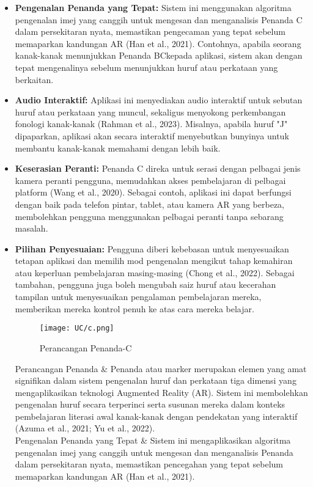 \begin{itemize}
\item \textbf{Pengenalan Penanda yang Tepat:} Sistem ini menggunakan algoritma pengenalan imej yang canggih untuk mengesan dan menganalisis Penanda C dalam persekitaran nyata, memastikan pengecaman yang tepat sebelum memaparkan kandungan AR (Han et al., 2021). Contohnya, apabila seorang kanak-kanak menunjukkan Penanda BCkepada aplikasi, sistem akan dengan tepat mengenalinya sebelum menunjukkan huruf atau perkataan yang berkaitan.  \\
\item \textbf{Audio Interaktif:} Aplikasi ini menyediakan audio interaktif untuk sebutan huruf atau perkataan yang muncul, sekaligus menyokong perkembangan fonologi kanak-kanak (Rahman et al., 2023). Misalnya, apabila huruf "J" dipaparkan, aplikasi akan secara interaktif menyebutkan bunyinya untuk membantu kanak-kanak memahami dengan lebih baik. \\ 
\item \textbf{Keserasian Peranti:} Penanda C direka untuk serasi dengan pelbagai jenis kamera peranti pengguna, memudahkan akses pembelajaran di pelbagai platform (Wang et al., 2020). Sebagai contoh, aplikasi ini dapat berfungsi dengan baik pada telefon pintar, tablet, atau kamera AR yang berbeza, membolehkan pengguna menggunakan pelbagai peranti tanpa sebarang masalah.  \\
\item \textbf{Pilihan Penyesuaian:} Pengguna diberi kebebasan untuk menyesuaikan tetapan aplikasi dan memilih mod pengenalan mengikut tahap kemahiran atau keperluan pembelajaran masing-masing (Chong et al., 2022). Sebagai tambahan, pengguna juga boleh mengubah saiz huruf atau kecerahan tampilan untuk menyesuaikan pengalaman pembelajaran mereka, memberikan mereka kontrol penuh ke atas cara mereka belajar.  \\
\clearpage
\begin{figure}
    \centering
    \texttt{[image: UC/c.png]}
    \caption{Perancangan Penanda-C}
\end{figure}
\clearpage
Perancangan Penanda & Penanda atau marker merupakan elemen yang amat signifikan dalam sistem pengenalan huruf dan perkataan tiga dimensi yang mengaplikasikan teknologi Augmented Reality (AR). Sistem ini membolehkan pengenalan huruf secara terperinci serta susunan mereka dalam konteks pembelajaran literasi awal kanak-kanak dengan pendekatan yang interaktif (Azuma et al., 2021; Yu et al., 2022). \\
\hline
Pengenalan Penanda yang Tepat & Sistem ini mengaplikasikan algoritma pengenalan imej yang canggih untuk mengesan dan menganalisis Penanda dalam persekitaran nyata, memastikan pencegahan yang tepat sebelum memaparkan kandungan AR (Han et al., 2021). \\

\end{itemize}
